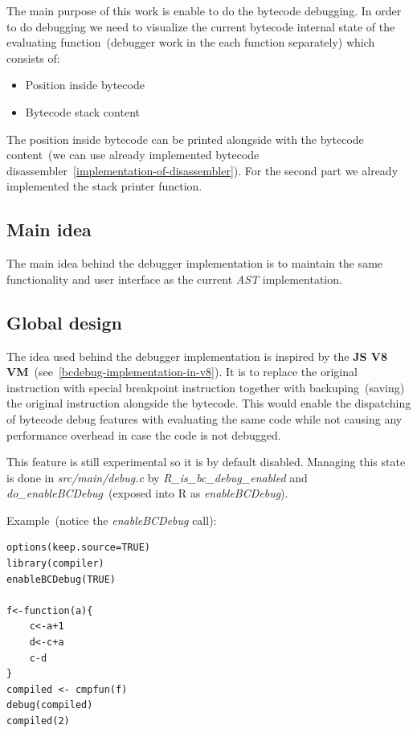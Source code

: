 \documentclass[thesis=M,english]{FITthesis}[2018/10/20]
\begin{document}
The main purpose of this work is enable to do the bytecode debugging. In order to do debugging we need to visualize the current bytecode internal state of the evaluating function~(debugger work in the each function separately) which consists of:

\begin{itemize}
	\item Position inside bytecode
	\item Bytecode stack content
\end{itemize}

The position inside bytecode can be printed alongside with the bytecode content~(we can use already implemented bytecode disassembler~\ref{implementation-of-disassembler}). For the second part we already implemented the stack printer function.

\subsection{Main idea}

The main idea behind the debugger implementation is to maintain the same functionality and user interface as the current \textit{AST} implementation.

\subsection{Global design}

The idea used behind the debugger implementation is inspired by the \textbf{JS V8 VM}~(see~\ref{bcdebug-implementation-in-v8}). It is to replace the original instruction with special breakpoint instruction together with backuping~(saving) the original instruction alongside the bytecode. This would enable the dispatching of bytecode debug features with evaluating the same code while not causing any performance overhead in case the code is not debugged.

This feature is still experimental so it is by default disabled. Managing this state is done in \textit{src/main/debug.c} by \textit{R{\_}is{\_}bc{\_}debug{\_}enabled} and \textit{do{\_}enableBCDebug}~(exposed into R as \textit{enableBCDebug}).

Example~(notice the \textit{enableBCDebug} call):
\begin{lstlisting}
options(keep.source=TRUE)
library(compiler)
enableBCDebug(TRUE)

f<-function(a){
    c<-a+1
    d<-c+a
    c-d
}
compiled <- cmpfun(f)
debug(compiled)
compiled(2)
\end{lstlisting}
\end{document}
